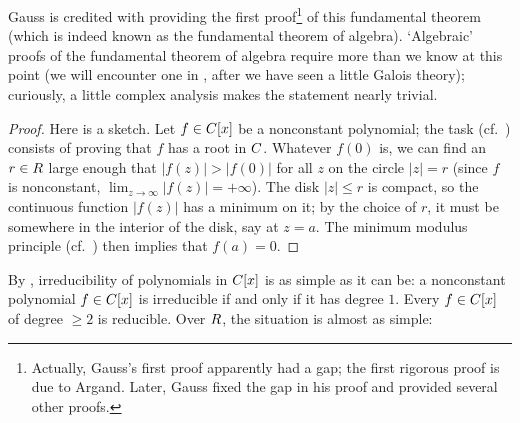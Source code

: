 Gauss is credited with providing the first proof\footnote{Actually,
  Gauss's first proof apparently had a gap; the first rigorous proof
  is due to Argand. Later, Gauss fixed the gap in his proof and
  provided several other proofs.} of this fundamental theorem (which
is indeed known as the fundamental theorem of algebra). `Algebraic'
proofs of the fundamental theorem of algebra require more than we know
at this point (we will encounter one in
, after we have
seen a little Galois theory); curiously, a little complex analysis
makes the statement nearly trivial.
\begin{proof}
  Here is a sketch. Let $f \in C[x]$ be a nonconstant polynomial; the
  task (cf.\ ) consists of proving that $f$ has a
  root in $C$. Whatever $f(0)$ is, we can find an $r \in R$ large
  enough that $|f(z)| > |f(0)|$ for all $z$ on the circle $|z| = r$
  (since $f$ is nonconstant, $\lim_{z \to \infty} |f(z)| =
  +\infty$). The disk $|z| \leq r$ is compact, so the continuous
  function $|f(z)|$ has a minimum on it; by the choice of $r$, it must
  be somewhere in the interior of the disk, say at $z = a$. The
  minimum modulus principle (cf.\
  ) then implies that
  $f(a) = 0$.
\end{proof}
By , irreducibility of polynomials in $C[x]$ is
as simple as it can be: a nonconstant polynomial $f \in C[x]$ is
irreducible if and only if it has degree $1$. Every $f \in C[x]$ of
degree $\geq 2$ is reducible. Over $R$, the situation is almost as
simple:

